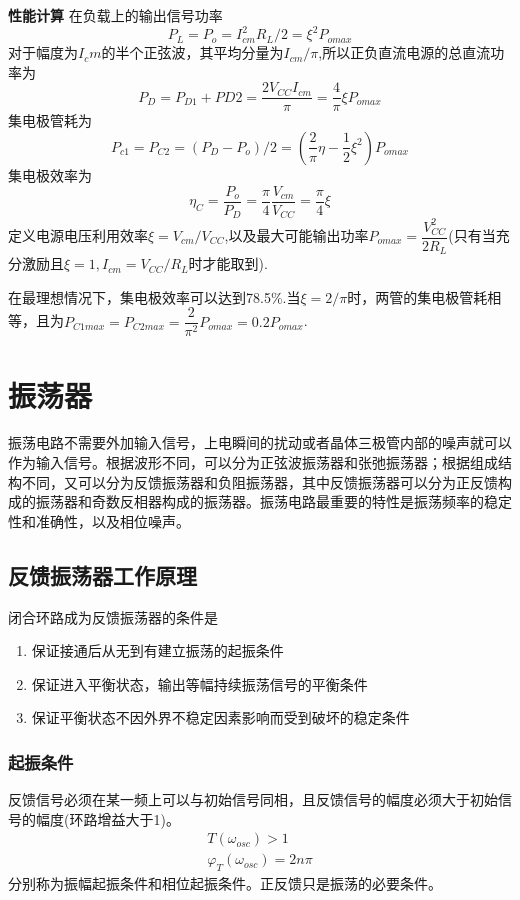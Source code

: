 \documentclass{ctexart}
\newcommand*{\noindbfquad}[1]{{\noindent \bf{#1} \qquad}}
\begin{document}
\noindbfquad{性能计算}
在负载上的输出信号功率
\begin{equation}
    P_L=P_o=I_{cm}^2 R_L /2=\xi ^2 P_{omax}
\end{equation}
对于幅度为$I_cm$的半个正弦波，其平均分量为$I_{cm}/\pi$,所以正负直流电源的总直流功率为
\begin{equation}
    P_D=P_{D1}+P{D2}=\dfrac{2V_{CC}I_{cm}}{\pi}=\dfrac{4}{\pi}\xi P_{omax}
\end{equation}
集电极管耗为
\begin{equation}
    P_{c1}=P_{C2}=(P_D - P_o)/2=(\dfrac{2}{\pi}\eta - \dfrac{1}{2}\xi ^2)P_{omax}
\end{equation}
集电极效率为
\begin{equation}
    \eta_C=\dfrac{P_o}{P_D}=\dfrac{\pi}{4}\dfrac{V_{cm}}{V_{CC}}=\dfrac{\pi}{4}\xi
\end{equation}
定义电源电压利用效率$\xi = V_{cm}/V_{CC}$,以及最大可能输出功率$P_{omax}=\dfrac{V_{CC}^2}{2R_L}$(只有当充分激励且$\xi = 1 ,I_{cm}=V_{CC}/R_L$时才能取到).

在最理想情况下，集电极效率可以达到78.5\%.当$\xi = 2/\pi$时，两管的集电极管耗相等，且为$P_{C1max}=P_{C2max}=\dfrac{2}{\pi ^2}P_{omax}=0.2P_{omax}$.{\color{red}{集电极效率和集电极管耗不同时取到！}}
\section{振荡器}
振荡电路不需要外加输入信号，上电瞬间的扰动或者晶体三极管内部的噪声就可以作为输入信号。根据波形不同，可以分为正弦波振荡器和张弛振荡器；根据组成结构不同，又可以分为反馈振荡器和负阻振荡器，其中反馈振荡器可以分为正反馈构成的振荡器和奇数反相器构成的振荡器。振荡电路最重要的特性是振荡频率的稳定性和准确性，以及相位噪声。
\subsection{反馈振荡器工作原理}
闭合环路成为反馈振荡器的条件是
\begin{enumerate}
    \item 保证接通后从无到有建立振荡的起振条件
    \item 保证进入平衡状态，输出等幅持续振荡信号的平衡条件
    \item 保证平衡状态不因外界不稳定因素影响而受到破坏的稳定条件
\end{enumerate}
\subsubsection{起振条件}
反馈信号必须在某一频上可以与初始信号同相，且反馈信号的幅度必须大于初始信号的幅度(环路增益大于1)。
\begin{align}
    T(\omega_{osc})>1\\
    \varphi_T(\omega_{osc})=2n\pi
\end{align}
分别称为振幅起振条件和相位起振条件。正反馈只是振荡的必要条件。
\end{document}
